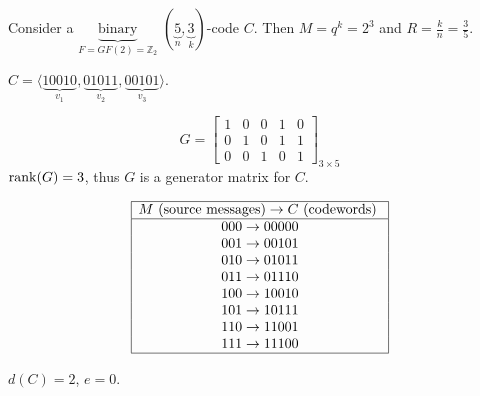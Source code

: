 
\begin{exbox}
    \begin{example}
        Consider a $ \underbrace{\text{binary}}_{F=GF(2)=\mathbb{Z}_2} $
        $ (\underbrace{5}_{n},\underbrace{3}_{k}) $-code $ C $. Then
        $ M=q^k=2^3 $ and $ R=\frac{k}{n} =\frac{3}{5} $.

        $ C=\langle \underbrace{10010}_{v_1},\underbrace{01011}_{v_2},\underbrace{00101}_{v_3} \rangle$.

        \[ G=
            \left[\begin{array}{ccc|cc}
                    1 & 0 & 0 & 1 & 0 \\
                    0 & 1 & 0 & 1 & 1 \\
                    0 & 0 & 1 & 0 & 1
                \end{array}\right]_{3\times{} 5} \]
        $ \operatorname{rank}(G)=3 $, thus $ G $ is a generator matrix for $ C $.

        \begin{center}
            \[
                \begin{array}{|c|}
                    \hline
                    M\text{ (source messages)} \rightarrow C\text{ (codewords) } \\
                    \hline
                    000 \rightarrow 00000                                        \\
                    001 \rightarrow 00101                                        \\
                    010 \rightarrow 01011                                        \\
                    011 \rightarrow 01110                                        \\
                    100 \rightarrow 10010                                        \\
                    101 \rightarrow 10111                                        \\
                    110 \rightarrow 11001                                        \\
                    111 \rightarrow 11100                                        \\
                    \hline
                \end{array}
            \]
        \end{center}
        $ d(C)=2 $, $ e=0 $.
    \end{example}
\end{exbox}

